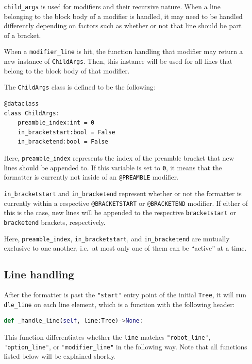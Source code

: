 \verb|child_args| is used for modifiers and their recursive nature. When a line belonging to the block body of a modifier is handled, it may need to be handled differently depending on factors such as whether or not that line should be part of a bracket. 

When a \verb|modifier_line| is hit, the function handling that modifier may return a new instance of \verb|ChildArgs|. Then, this instance will be used for all lines that belong to the block body of that modifier. 

The \verb|ChildArgs| class is defined to be the following:

\begin{lstlisting}
@dataclass
class ChildArgs:
    preamble_index:int = 0
    in_bracketstart:bool = False
    in_bracketend:bool = False
\end{lstlisting}

Here, \verb|preamble_index| represents the index of the preamble bracket that new lines should be appended to. If this variable is set to \verb|0|, it means that the formatter is currently not inside of an \verb|@PREAMBLE| modifier. 

\verb|in_bracketstart| and \verb|in_bracketend| represent whether or not the formatter is currently within a respective \verb|@BRACKETSTART| or \verb|@BRACKETEND| modifier. If either of this is the case, new lines will be appended to the respective \verb|bracketstart| or \verb|bracketend| brackets, respectively.

Here, \verb|preamble_index|, \verb|in_bracketstart|, and \verb|in_bracketend| are mutually exclusive to one another, i.e.\ at most only one of them can be ``active'' at a time.

\subsection{Line handling}

After the formatter is past the \verb|"start"| entry point of the initial \verb|Tree|, it will run \verb|dle_line| on each line element, which is a function with the following header:

\begin{lstlisting}[language=Python]
def _handle_line(self, line:Tree)->None:
\end{lstlisting}

This function differentiates whether the \verb|line| matches \verb|"robot_line"|, \verb|"option_line"|, or \verb|"modifier_line"| in the following way. Note that all functions listed below will be explained shortly. 

